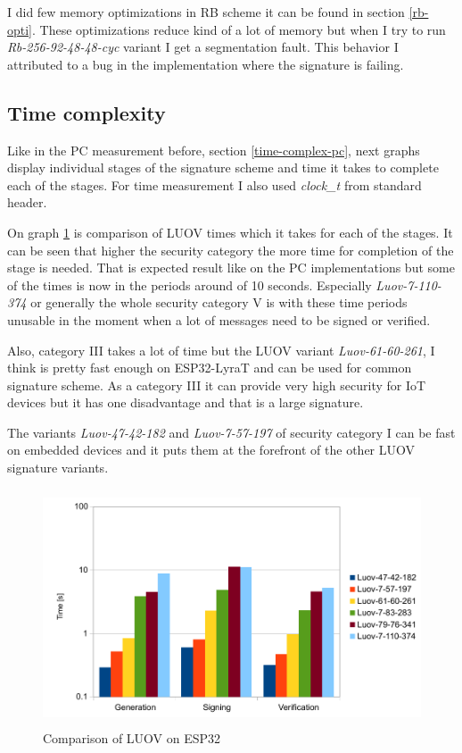 \documentclass[thesis=M,english]{FITthesis}[2019/12/23]
\begin{document}
\bigskip
\noindent
I did few memory optimizations in RB scheme it can be found in section \ref{rb-opti}. These optimizations reduce kind of a lot of memory but when I try to run \textit{Rb-256-92-48-48-cyc} variant I get a segmentation fault. This behavior I attributed to a bug in the implementation where the signature is failing. 

\subsection{Time complexity}
Like in the PC measurement before, section \ref{time-complex-pc}, next graphs display individual stages of the signature scheme and time it takes to complete each of the stages. For time measurement I also used \textit{clock\_t} from standard header.

\bigskip
\noindent
On graph \ref{time-luov} is comparison of LUOV times which it takes for each of the stages. It can be seen that higher the security category the more time for completion of the stage is needed. That is expected result like on the PC implementations but some of the times is now in the periods around of 10 seconds. Especially \textit{Luov-7-110-374} or generally the whole security category V is with these time periods unusable in the moment when a lot of messages need to be signed or verified.

\bigskip
\noindent
Also, category III takes a lot of time but the LUOV variant \textit{Luov-61-60-261}, I think is pretty fast enough on ESP32-LyraT and can be used for common signature scheme. As a category III it can provide very high security for IoT devices but it has one disadvantage and that is a large signature.

\bigskip
\noindent
The variants \textit{Luov-47-42-182} and \textit{Luov-7-57-197} of security category I can be fast on embedded devices and it puts them at the forefront of the other LUOV signature variants.

\bigskip
\begin{figure}[H]
\centering
\includegraphics[width=13cm,height=7cm]{images/time-luov.pdf}
\caption{Comparison of LUOV on ESP32}
\label{time-luov}
\end{figure}
\end{document}
